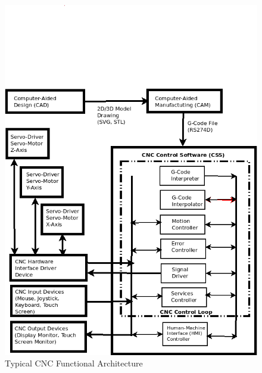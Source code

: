 \begin{figure}
	\centering
	\caption{Typical CNC Functional Architecture}
	\label{Functional-Architecture-of-CNC-System.png}
	\includegraphics[width=1.00\textwidth]{Chap2/Images/Functional-Architecture-of-CNC-System.png} 

\end{figure}



